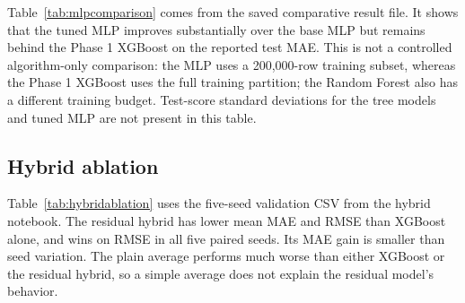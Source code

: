 \documentclass[conference]{IEEEtran}
\begin{document}
Table~\ref{tab:mlpcomparison} comes from the saved comparative result file. It shows that the tuned MLP improves substantially over the base MLP but remains behind the Phase 1 XGBoost on the reported test MAE. This is not a controlled algorithm-only comparison: the MLP uses a 200,000-row training subset, whereas the Phase 1 XGBoost uses the full training partition; the Random Forest also has a different training budget. Test-score standard deviations for the tree models and tuned MLP are not present in this table.

\begin{table}[!t]
\centering
\caption{Saved comparative benchmark across Phase 1 and Phase 2 models. Phase 2 MLPs use a 200,000-row training subset; tree results are inherited from Phase 1 with their original training budgets.}
\label{tab:mlpcomparison}
\end{table}

\subsection{Hybrid ablation}
Table~\ref{tab:hybridablation} uses the five-seed validation CSV from the hybrid notebook. The residual hybrid has lower mean MAE and RMSE than XGBoost alone, and wins on RMSE in all five paired seeds. Its MAE gain is smaller than seed variation. The plain average performs much worse than either XGBoost or the residual hybrid, so a simple average does not explain the residual model's behavior.

\begin{table}[!t]
\centering
\caption{Five-seed hybrid ablation on the validation split (20,000 training rows). Values are mean $\pm$ standard deviation.}
\label{tab:hybridablation}
\end{table}
\end{document}
